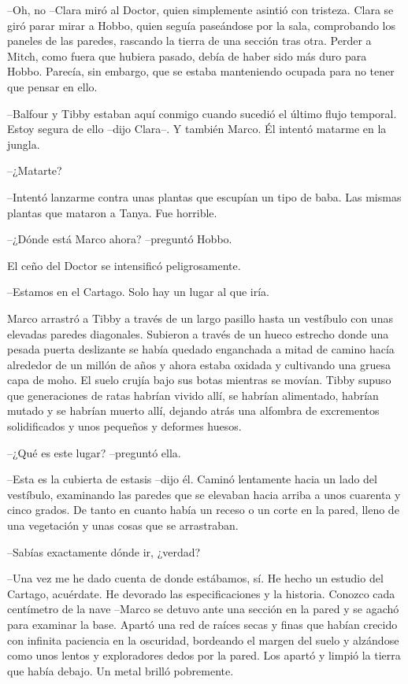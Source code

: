 {--Oh, no --Clara miró al Doctor, quien simplemente asintió con tristeza.
 Clara se giró parar mirar a Hobbo, quien seguía paseándose por la sala,
 comprobando los paneles de las paredes, rascando la tierra de una
 sección tras otra. Perder a Mitch, como fuera que hubiera pasado, debía
 de haber sido más duro para Hobbo. Parecía, sin embargo, que se estaba
manteniendo ocupada para no tener que pensar en ello.}

{--Balfour y Tibby estaban aquí conmigo cuando sucedió el último flujo
 temporal. Estoy segura de ello --dijo Clara--. Y también Marco. Él
intentó matarme en la jungla.}

{--¿Matarte?}

{--Intentó lanzarme contra unas plantas que escupían un tipo de baba. Las
mismas plantas que mataron a Tanya. Fue horrible.}

{--¿Dónde está Marco ahora? --preguntó Hobbo.}

{El ceño del Doctor se intensificó peligrosamente.}

{--Estamos en el Cartago. Solo hay un lugar al que
 iría.}

{Marco arrastró a Tibby a través de un largo
 pasillo hasta un vestíbulo con unas elevadas paredes diagonales.
 Subieron a través de un hueco estrecho donde una pesada puerta
 deslizante se había quedado enganchada a mitad de camino hacía alrededor
 de un millón de años y ahora estaba oxidada y cultivando una gruesa capa
 de moho. El suelo crujía bajo sus botas mientras se movían. Tibby supuso
 que generaciones de ratas habrían vivido allí, se habrían alimentado,
 habrían mutado y se habrían muerto allí, dejando atrás una alfombra de
excrementos solidificados y unos pequeños y deformes huesos.}

{--¿Qué es este lugar? --preguntó ella.}

{--Esta es la cubierta de estasis --dijo él. Caminó lentamente hacia un
 lado del vestíbulo, examinando las paredes que se elevaban hacia arriba
 a unos cuarenta y cinco grados. De tanto en cuanto había un receso o un
 corte en la pared, lleno de una vegetación y unas cosas que se
arrastraban.}

{--Sabías exactamente dónde ir, ¿verdad?}

{--Una vez me he dado cuenta de donde estábamos, sí. He hecho un estudio
 del Cartago, acuérdate. He devorado las especificaciones y la historia.
 Conozco cada centímetro de la nave --Marco se detuvo ante una sección en
 la pared y se agachó para examinar la base. Apartó una red de raíces
 secas y finas que habían crecido con infinita paciencia en la oscuridad,
 bordeando el margen del suelo y alzándose como unos lentos y
 exploradores dedos por la pared. Los apartó y limpió la tierra que había
debajo. Un metal brilló pobremente.}

